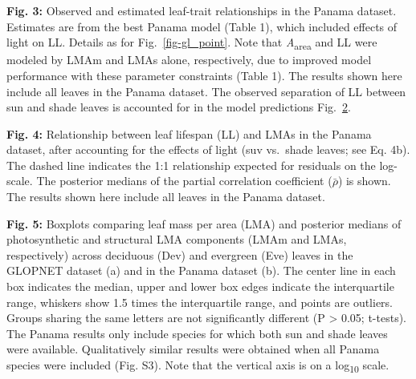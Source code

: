 \documentclass[
  12pt,
  letterpaper,
  DIV=11,
  numbers=noendperiod]{scrartcl}
\begin{document}
\begin{figure}

\centering{

}

\caption{\label{fig-pa_point}}

\end{figure}%

\textbf{Fig. 3:} Observed and estimated leaf-trait relationships in the
Panama dataset. Estimates are from the best Panama model (Table 1),
which included effects of light on LL. Details as for
Fig.~\ref{fig-gl_point}. Note that \emph{A}\textsubscript{area} and LL
were modeled by LMAm and LMAs alone, respectively, due to improved model
performance with these parameter constraints (Table 1). The results
shown here include all leaves in the Panama dataset. The observed
separation of LL between sun and shade leaves is accounted for in the
model predictions Fig.~\ref{fig-ll_point}.

\begin{figure}

\centering{

}

\caption{\label{fig-ll_point}}

\end{figure}%

\textbf{Fig. 4:} Relationship between leaf lifespan (LL) and LMAs in the
Panama dataset, after accounting for the effects of light (suv vs.~shade
leaves; see Eq. 4b). The dashed line indicates the 1:1 relationship
expected for residuals on the log-scale. The posterior medians of the
partial correlation coefficient (\(\bar{\rho}\)) is shown. The results
shown here include all leaves in the Panama dataset.

\begin{figure}

\centering{

}

\caption{\label{fig-box_de}}

\end{figure}%

\textbf{Fig. 5:} Boxplots comparing leaf mass per area (LMA) and
posterior medians of photosynthetic and structural LMA components (LMAm
and LMAs, respectively) across deciduous (Dev) and evergreen (Eve)
leaves in the GLOPNET dataset (a) and in the Panama dataset (b). The
center line in each box indicates the median, upper and lower box edges
indicate the interquartile range, whiskers show 1.5 times the
interquartile range, and points are outliers. Groups sharing the same
letters are not significantly different (P \textgreater{} 0.05;
t-tests). The Panama results only include species for which both sun and
shade leaves were available. Qualitatively similar results were obtained
when all Panama species were included (Fig. S3). Note that the vertical
axis is on a log\textsubscript{10} scale.
\end{document}
